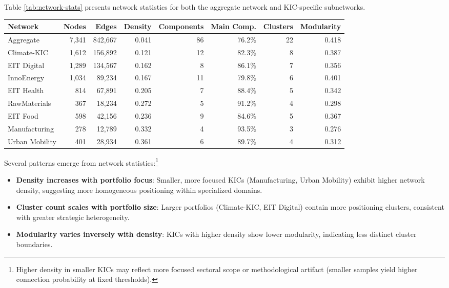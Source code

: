 \documentclass[../main.tex]{subfiles}
\begin{document}
Table \ref{tab:network-stats} presents network statistics for both the aggregate network and KIC-specific subnetworks.

\begin{center}
\small
\begin{tabular}{lrrrrrrr}
\toprule
\textbf{Network} & \textbf{Nodes} & \textbf{Edges} & \textbf{Density} & \textbf{Components} & \textbf{Main Comp.} & \textbf{Clusters} & \textbf{Modularity} \\
\midrule
Aggregate & 7,341 & 842,667 & 0.041 & 86 & 76.2\% & 22 & 0.418 \\
\midrule
Climate-KIC & 1,612 & 156,892 & 0.121 & 12 & 82.3\% & 8 & 0.387 \\
EIT Digital & 1,289 & 134,567 & 0.162 & 8 & 86.1\% & 7 & 0.356 \\
InnoEnergy & 1,034 & 89,234 & 0.167 & 11 & 79.8\% & 6 & 0.401 \\
EIT Health & 814 & 67,891 & 0.205 & 7 & 88.4\% & 5 & 0.342 \\
RawMaterials & 367 & 18,234 & 0.272 & 5 & 91.2\% & 4 & 0.298 \\
EIT Food & 598 & 42,156 & 0.236 & 9 & 84.6\% & 5 & 0.367 \\
Manufacturing & 278 & 12,789 & 0.332 & 4 & 93.5\% & 3 & 0.276 \\
Urban Mobility & 401 & 28,934 & 0.361 & 6 & 89.7\% & 4 & 0.312 \\
\bottomrule
\end{tabular}
\end{center}

Several patterns emerge from network statistics:\footnote{Higher density in smaller KICs may reflect more focused sectoral scope or methodological artifact (smaller samples yield higher connection probability at fixed thresholds).}

\begin{itemize}
    \item \textbf{Density increases with portfolio focus}: Smaller, more focused KICs (Manufacturing, Urban Mobility) exhibit higher network density, suggesting more homogeneous positioning within specialized domains.
    \item \textbf{Cluster count scales with portfolio size}: Larger portfolios (Climate-KIC, EIT Digital) contain more positioning clusters, consistent with greater strategic heterogeneity.
    \item \textbf{Modularity varies inversely with density}: KICs with higher density show lower modularity, indicating less distinct cluster boundaries.
\end{itemize}
\end{document}
